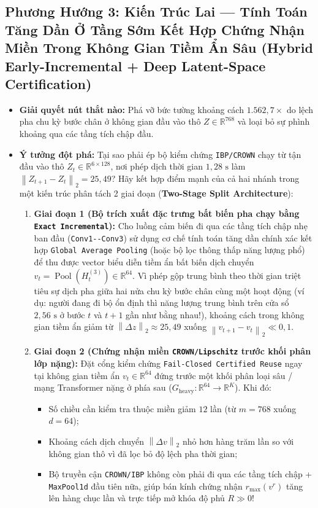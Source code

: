 \documentclass[11pt,a4paper]{article}
\newcommand{\R}{\mathbb{R}}
\newcommand{\norm}[1]{\left\lVert #1\right\rVert}
\newcommand{\code}[1]{{\small\ttfamily\nolinkurl{#1}}}
\begin{document}
\subsection{Phương Hướng 3: Kiến Trúc Lai --- Tính Toán Tăng Dần Ở Tầng Sớm Kết Hợp Chứng Nhận Miền Trong Không Gian Tiềm Ẩn Sâu (Hybrid Early-Incremental + Deep Latent-Space Certification)}
\begin{itemize}
  \item \textbf{Giải quyết nút thắt nào:} Phá vỡ bức tường khoảng cách $1.562,7\times$ do lệch pha chu kỳ bước chân ở không gian đầu vào thô $Z \in \R^{768}$ và loại bỏ sự phình khoảng qua các tầng tích chập đầu.
  \item \textbf{Ý tưởng đột phá:} Tại sao phải ép bộ kiểm chứng \code{IBP/CROWN} chạy từ tận đầu vào thô $Z_t \in \R^{6 \times 128}$, nơi phép dịch thời gian $1,28\text{ s}$ làm $\norm{Z_{t+1} - Z_t}_2 = 25,49$?
  Hãy kết hợp điểm mạnh của cả hai nhánh trong một kiến trúc phân tách 2 giai đoạn (\textbf{Two-Stage Split Architecture}):
  \begin{enumerate}
    \item \textbf{Giai đoạn 1 (Bộ trích xuất đặc trưng bất biến pha chạy bằng \code{Exact Incremental}):} Cho luồng cảm biến đi qua các tầng tích chập nhẹ ban đầu (\code{Conv1--Conv3}) sử dụng cơ chế tính toán tăng dần chính xác kết hợp \code{Global Average Pooling} (hoặc bộ lọc thông thấp năng lượng phổ) để thu được vector biểu diễn tiềm ẩn bất biến dịch chuyển $v_t = \operatorname{Pool}(H^{(3)}_t) \in \R^{64}$. Vì phép gộp trung bình theo thời gian triệt tiêu sự dịch pha giữa hai nửa chu kỳ bước chân cùng một hoạt động (ví dụ: người đang đi bộ ổn định thì năng lượng trung bình trên cửa sổ $2,56\text{ s}$ ở bước $t$ và $t+1$ gần như bằng nhau!), khoảng cách trong không gian tiềm ẩn giảm từ $\norm{\Delta z}_2 \approx 25,49$ xuống $\norm{v_{t+1} - v_t}_2 \ll 0,1$.
    \item \textbf{Giai đoạn 2 (Chứng nhận miền \code{CROWN/Lipschitz} trước khối phân lớp nặng):} Đặt cổng kiểm chứng \code{Fail-Closed Certified Reuse} ngay tại không gian tiềm ẩn $v_t \in \R^{64}$ đứng trước một khối phân loại sâu / mạng Transformer nặng ở phía sau ($G_{\text{heavy}}: \R^{64} \to \R^{K}$). Khi đó:
    \begin{itemize}
      \item Số chiều cần kiểm tra thuộc miền giảm $12$ lần (từ $m=768$ xuống $d=64$);
      \item Khoảng cách dịch chuyển $\norm{\Delta v}_2$ nhỏ hơn hàng trăm lần so với không gian thô vì đã lọc bỏ độ lệch pha thời gian;
      \item Bộ truyền cận \code{CROWN/IBP} không còn phải đi qua các tầng tích chập + \code{MaxPool1d} đầu tiên nữa, giúp bán kính chứng nhận $r_{\max}(v^r)$ tăng lên hàng chục lần và trực tiếp mở khóa độ phủ $R \gg 0$!
    \end{itemize}
  \end{enumerate}
\end{itemize}
\end{document}
